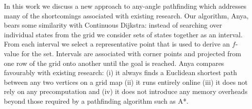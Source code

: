 In this work we discuss a new approach to any-angle pathfinding which
addresses many of the shortcomings associated with existing research.
Our algorithm, Anya, bears some similarity with Continuous Dijkstra: 
instead of searching over individual states from the grid we consider
sets of states together as an interval. From each interval we select a 
representative point that is used to derive an $f$-value for the set.
Intervals are associated with corner points and projected from one 
row of the grid onto another until the goal is reached.
Anya compares favourably with existing research: (i)
it always finds a Euclidean shortest path between any two vertices on
a grid map (ii) it runs entirely online (iii) it does not rely on any 
precomputation and (iv) it does not introduce any memory overheads beyond
those required by a pathfinding algorithm such as A*.

